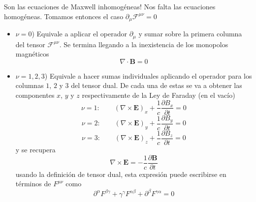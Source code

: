 Son las ecuaciones de Maxwell inhomogéneas! Nos falta las ecuaciones homogéneas. Tomamos entonces el caso $\partial_{\mu}\mathcal{F}^{\mu\nu} = 0$
\begin{itemize}
    \item $\nu = 0$) Equivale a aplicar el operador $\partial_{\mu}$ y sumar sobre la primera columna del tensor $\mathcal{F}^{\mu\nu}$. Se termina llegando a la inexistencia de los monopolos magnéticos
    \begin{equation*}
        \nabla \cdot \textbf{B} = 0
    \end{equation*}
    
    \item $\nu = 1,2,3$) Equivale a hacer sumas individuales aplicando el operador para los columnas $1$, $2$ y $3$ del tensor dual. De cada una de estas se va a obtener las componentes $x$, $y$ y $z$ respectivamente de la Ley de Faraday (en el vacío)
    \begin{equation*}
        \nu = 1:
        \quad
        \quad
        \left(
            \nabla \times \textbf{E}
        \right)_{x} 
        + \frac{1}{c}\frac{\partial B_{x}}{\partial t}
        = 0
    \end{equation*}
    \begin{equation*}
        \nu = 2:
        \quad
        \quad
        \left(
            \nabla \times \textbf{E}
        \right)_{y} 
        + \frac{1}{c}\frac{\partial B_{y}}{\partial t}
        = 0
    \end{equation*}
    \begin{equation*}
        \nu = 3:
        \quad
        \quad
        \left(
            \nabla \times \textbf{E}
        \right)_{z} 
        + \frac{1}{c}\frac{\partial B_{z}}{\partial t}
        = 0
    \end{equation*}
    y se recupera
    \begin{equation*}
        \nabla \times \textbf{E} = 
        -\frac{1}{c}
        \frac{\partial \textbf{B}}{\partial t}
    \end{equation*}
    usando la definición de tensor dual, esta expresión puede escribirse en términos de $F^{\mu\nu}$ como
    \begin{equation*}
        \partial^{\alpha}F^{\beta\gamma}
        +\gamma^{\gamma}F^{\alpha\beta}
        +\partial^{\beta}F^{\gamma\alpha}
        = 0
    \end{equation*}
\end{itemize}




